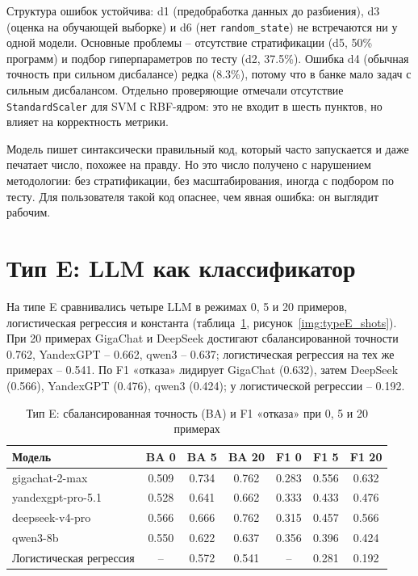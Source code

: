 \documentclass{bmstu}
\begin{document}

Структура ошибок устойчива: d1 (предобработка данных до разбиения), d3 (оценка на обучающей выборке) и d6 (нет \texttt{random\_state}) не встречаются ни у одной модели. Основные проблемы -- отсутствие стратификации (d5, 50\% программ) и подбор гиперпараметров по тесту (d2, 37.5\%). Ошибка d4 (обычная точность при сильном дисбалансе) редка (8.3\%), потому что в банке мало задач с сильным дисбалансом. Отдельно проверяющие отмечали отсутствие \texttt{StandardScaler} для SVM с RBF-ядром: это не входит в шесть пунктов, но влияет на корректность метрики.

Модель пишет синтаксически правильный код, который часто запускается и даже печатает число, похожее на правду. Но это число получено с нарушением методологии: без стратификации, без масштабирования, иногда с подбором по тесту. Для пользователя такой код опаснее, чем явная ошибка: он выглядит рабочим.

\section{Тип E: LLM как классификатор}
На типе E сравнивались четыре LLM в режимах 0, 5 и 20 примеров, логистическая регрессия и константа (таблица~\ref{tab:typeE}, рисунок~\ref{img:typeE_shots}). При 20 примерах GigaChat и DeepSeek достигают сбалансированной точности 0.762, YandexGPT -- 0.662, qwen3 -- 0.637; логистическая регрессия на тех же примерах -- 0.541. По F1 «отказа» лидирует GigaChat (0.632), затем DeepSeek (0.566), YandexGPT (0.476), qwen3 (0.424); у логистической регрессии -- 0.192.

\begin{table}[htbp]
\centering
\caption{Тип E: сбалансированная точность (BA) и F1 «отказа» при 0, 5 и 20 примерах}
\label{tab:typeE}
\setlength{\tabcolsep}{3pt}
\begin{tabular}{|l|c|c|c|c|c|c|}
\hline
Модель & BA 0 & BA 5 & BA 20 & F1 0 & F1 5 & F1 20 \\
\hline
gigachat-2-max & 0.509 & 0.734 & 0.762 & 0.283 & 0.556 & 0.632 \\
yandexgpt-pro-5.1 & 0.528 & 0.641 & 0.662 & 0.333 & 0.433 & 0.476 \\
deepseek-v4-pro & 0.566 & 0.666 & 0.762 & 0.315 & 0.457 & 0.566 \\
qwen3-8b & 0.550 & 0.622 & 0.637 & 0.356 & 0.396 & 0.424 \\
Логистическая регрессия & -- & 0.572 & 0.541 & -- & 0.281 & 0.192 \\
\hline
\end{tabular}
\vspace{-10pt}
\end{table}
\end{document}
